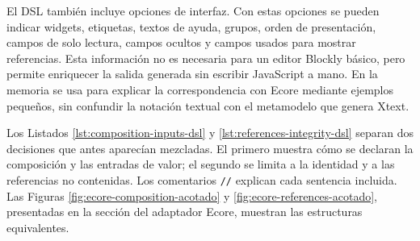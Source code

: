 El DSL también incluye opciones de interfaz. Con estas opciones se pueden indicar
widgets, etiquetas, textos de ayuda, grupos,
orden de presentación, campos de solo lectura, campos ocultos y campos usados
para mostrar referencias. Esta información no es necesaria para un editor
Blockly básico, pero permite enriquecer la salida generada sin escribir
JavaScript a mano. En la memoria se usa para explicar la correspondencia con
Ecore mediante ejemplos pequeños, sin confundir la notación textual con el
metamodelo que genera Xtext.

Los Listados \ref{lst:composition-inputs-dsl} y
\ref{lst:references-integrity-dsl} separan dos decisiones que antes aparecían
mezcladas. El primero muestra cómo se declaran la composición y las entradas de
valor; el segundo se limita a la identidad y a las referencias no contenidas.
Los comentarios \texttt{//} explican cada sentencia incluida. Las Figuras
\ref{fig:ecore-composition-acotado} y
\ref{fig:ecore-references-acotado}, presentadas en la sección del adaptador
Ecore, muestran las estructuras equivalentes.

